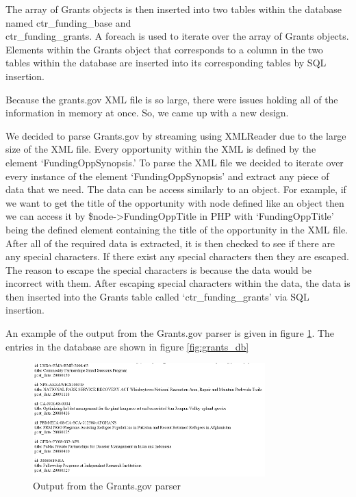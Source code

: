 \documentclass[onecolumn]{IEEEtran}
\begin{document}
The array of Grants objects is then inserted into two tables within the database named ctr\_funding\_base and \\ ctr\_funding\_grants. A foreach is used to iterate over the array of Grants objects. Elements within the Grants object that corresponds to a column in the two tables within the database are inserted into its corresponding tables by SQL insertion. 

Because the grants.gov XML file is so large, there were issues holding all of the information in memory at once. So, we came up with a new design.

We decided to parse Grants.gov by streaming using XMLReader due to the large size of the XML file. Every opportunity within the XML is defined by the element `FundingOppSynopsis.' To parse the XML file we decided to iterate over every instance of the element `FundingOppSynopsis' and extract any piece of data that we need. The data can be access similarly to an object. For example, if we want to get the title of the opportunity with node defined like an object then we can access it by \$node-\textgreater FundingOppTitle in PHP with `FundingOppTitle' being the defined element containing the title of the opportunity in the XML file. After all of the required data is extracted, it is then checked to see if there are any special characters. If there exist any special characters then they are escaped. The reason to escape the special characters is because the data would be incorrect with them. After escaping special characters within the data, the data is then inserted into the Grants table called `ctr\_funding\_grants' via SQL insertion.  

An example of the output from the Grants.gov parser is given in figure \ref{fig:grants_output}. The entries in the database are shown in figure \ref{fig:grants_db}

\begin{figure}
    \centering
    \includegraphics[width=0.8\textwidth]{senior_design_grants_output.png}
    \caption{Output from the Grants.gov parser}
    \label{fig:grants_output}
\end{figure}
\end{document}
